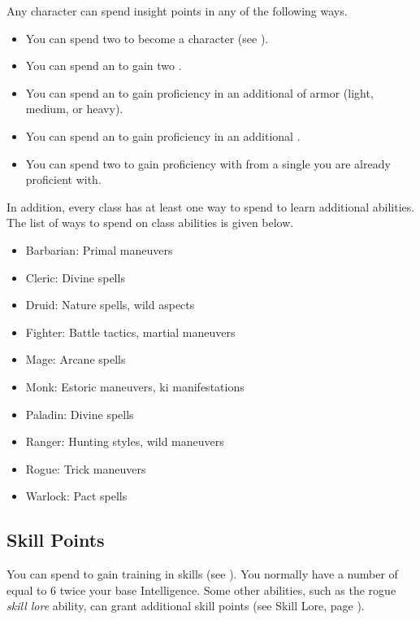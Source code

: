         Any character can spend insight points in any of the following ways.
        \begin{itemize}
            \item You can spend two  to become a  character (see ).
            \item You can spend an  to gain two .
            \item You can spend an  to gain proficiency in an additional  of armor (light, medium, or heavy).
            \item You can spend an  to gain proficiency in an additional .
            \item You can spend two  to gain proficiency with  from a single  you are already proficient with.
        \end{itemize}
        In addition, every class has at least one way to spend  to learn additional abilities.
        The list of ways to spend  on class abilities is given below.
        \begin{itemize}
            \item Barbarian: Primal maneuvers
            \item Cleric: Divine spells
            \item Druid: Nature spells, wild aspects
            \item Fighter: Battle tactics, martial maneuvers
            \item Mage: Arcane spells
            \item Monk: Estoric maneuvers, ki manifestations
            \item Paladin: Divine spells
            \item Ranger: Hunting styles, wild maneuvers
            \item Rogue: Trick maneuvers
            \item Warlock: Pact spells
        \end{itemize}

    \subsection{Skill Points}\label{Skill Points}
        You can spend  to gain training in skills (see ).
        You normally have a number of  equal to 6 \add twice your base Intelligence.
        Some other abilities, such as the rogue \textit{skill lore} ability, can grant additional skill points (see Skill Lore, page ).

